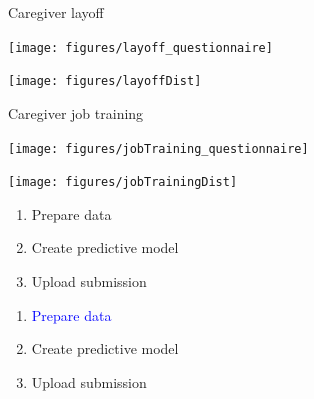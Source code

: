 \documentclass[aspectratio=169]{beamer}
\begin{document}
\begin{frame}{Caregiver layoff}

\centering
\texttt{[image: figures/layoff\_questionnaire]}

\end{frame}
\begin{frame}

\centering
\texttt{[image: figures/layoffDist]}

\end{frame}
\begin{frame}{Caregiver job training}

\centering
\texttt{[image: figures/jobTraining\_questionnaire]}

\end{frame}
\begin{frame}

\centering
\texttt{[image: figures/jobTrainingDist]}

\end{frame}
\begin{frame}

\begin{enumerate}
\item Prepare data
\item Create predictive model
\item Upload submission
\end{enumerate}

\end{frame}
\begin{frame}

\begin{enumerate}
\item \textcolor{blue}{Prepare data}
\item Create predictive model
\item Upload submission
\end{enumerate}

\end{frame}
\end{document}
